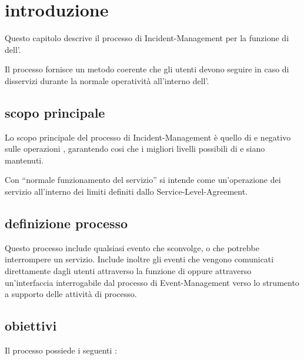 %
%
\section[Introduzione]{introduzione}
\label{im-introduction}
Questo capitolo descrive il processo di \acf{Incident-Management} per la funzione di  dell'\entity{}.

Il processo fornisce un metodo coerente che gli utenti devono seguire in caso di disservizi durante la normale operatività all'interno dell'\entity{}.

\subsection[Scopo principale]{scopo principale}
\label{im-introduction-scope}
Lo scopo principale del processo di \ac{Incident-Management} è quello di  e  negativo sulle operazioni , garantendo cosi che i migliori livelli possibili di  e  siano mantenuti.

Con ``normale funzionamento del servizio'' si intende come un'operazione dei servizio all'interno dei limiti definiti dallo \ac{Service-Level-Agreement}.

\subsection[Definizione processo]{definizione processo}
\label{im-introduction-definition}
Questo processo include qualsiasi evento che sconvolge, o che potrebbe interrompere un servizio. Include inoltre gli eventi che vengono comunicati direttamente dagli utenti attraverso la funzione di  oppure attraverso un'interfaccia interrogabile dal processo di \ac{Event-Management} verso lo strumento a supporto delle attività di processo.

\subsection[Obiettivi]{obiettivi}
\label{im-introduction-objectives}
Il processo possiede i seguenti :

